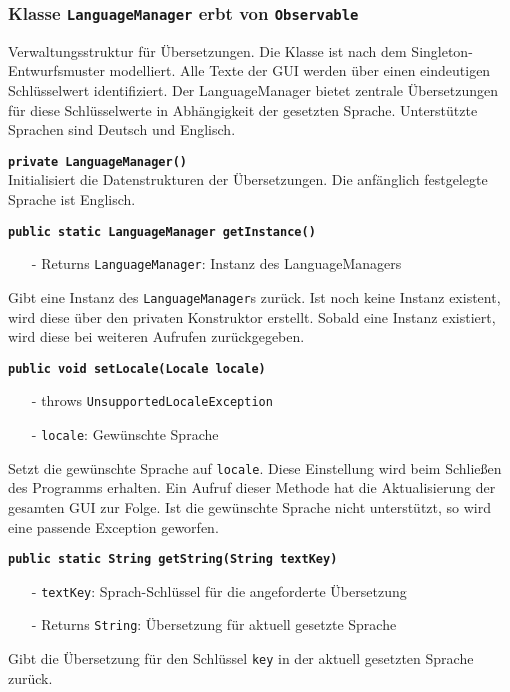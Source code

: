 \documentclass[parskip=full,11pt,twoside]{scrartcl}
\begin{document}
\subsubsection{Klasse \texttt{LanguageManager} erbt von \texttt{Observable}}

Verwaltungsstruktur für Übersetzungen. Die Klasse ist nach dem Singleton-Entwurfsmuster modelliert. Alle Texte der GUI werden über einen eindeutigen Schlüsselwert identifiziert. Der LanguageManager bietet zentrale Übersetzungen für diese Schlüsselwerte in Abhängigkeit der gesetzten Sprache. Unterstützte Sprachen sind Deutsch und Englisch.

\textbf{\texttt{private LanguageManager()}}\\
Initialisiert die Datenstrukturen der Übersetzungen. Die anfänglich festgelegte Sprache ist Englisch.

\textbf{\texttt{public static LanguageManager getInstance()}}
\begin{itemize}[noitemsep]
	\item[-] Returns \texttt{LanguageManager}: Instanz des LanguageManagers
\end{itemize}
Gibt eine Instanz des \texttt{LanguageManager}s zurück. Ist noch keine Instanz existent, wird diese über den privaten Konstruktor erstellt. Sobald eine Instanz existiert, wird diese bei weiteren Aufrufen zurückgegeben.

\textbf{\texttt{public void setLocale(Locale locale)}}
\begin{itemize}[noitemsep]
	\item[-] throws \texttt{UnsupportedLocaleException}
	\item[-] \texttt{locale}: Gewünschte Sprache
\end{itemize}
Setzt die gewünschte Sprache auf \texttt{locale}. Diese Einstellung wird beim Schließen des Programms erhalten. Ein Aufruf dieser Methode hat die Aktualisierung der gesamten GUI zur Folge. Ist die gewünschte Sprache nicht unterstützt, so wird eine passende Exception geworfen.

\textbf{\texttt{public static String getString(String textKey)}}
\begin{itemize}[noitemsep]
	\item[-] \texttt{textKey}: Sprach-Schlüssel für die angeforderte Übersetzung
	\item[-] Returns \texttt{String}: Übersetzung für aktuell gesetzte Sprache
\end{itemize}
Gibt die Übersetzung für den Schlüssel \texttt{key} in der aktuell gesetzten Sprache zurück.
\end{document}

